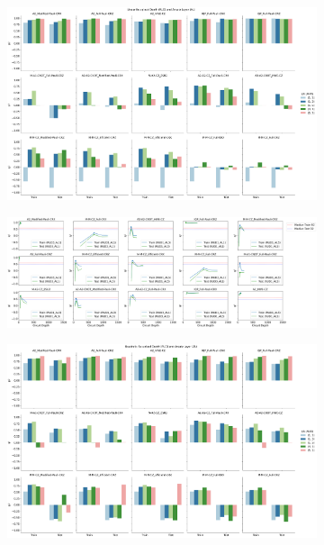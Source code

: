 \documentclass[journal=jacsat,manuscript=article]{achemso}
\begin{document}
\begin{figure}[H]
	\centering	
	\begin{subfigure}[b]{0.49\textwidth}
		\centering
		\includegraphics[width=\linewidth]{../images/Function_Fitting/sixteenqubit/16qubit_Linear_RUD_AL}
		\caption{}
		\label{fig:16qubit_Linear_RUD_AL}
	\end{subfigure}
	\hfill	
	\begin{subfigure}[b]{0.49\textwidth}
		\centering
		\includegraphics[width=\linewidth]{../images/Function_Fitting/linear_circuitdepth_vs_R2}
		\caption{}
		\label{fig:linear_circuitdepth_vs_R2}
	\end{subfigure}
	\hfill		
	\begin{subfigure}[b]{0.49\textwidth}
		\centering
		\includegraphics[width=\linewidth]{../images/Function_Fitting/sixteenqubit/16qubit_Quadratic_RUD_AL}

\end{subfigure}
\end{figure}
\end{document}
